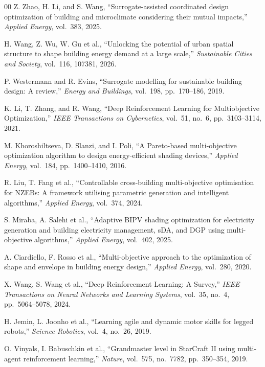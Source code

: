 \begin{thebibliography}{00}
Z. Zhao, H. Li, and S. Wang, ``Surrogate-assisted coordinated design optimization of building and microclimate considering their mutual impacts,'' \emph{Applied Energy}, vol.~383, 2025.

H. Wang, Z. Wu, W. Gu et al., ``Unlocking the potential of urban spatial structure to shape building energy demand at a large scale,'' \emph{Sustainable Cities and Society}, vol.~116, 107381, 2026.

P. Westermann and R. Evins, ``Surrogate modelling for sustainable building design: A review,'' \emph{Energy and Buildings}, vol.~198, pp.~170--186, 2019.

K. Li, T. Zhang, and R. Wang, ``Deep Reinforcement Learning for Multiobjective Optimization,'' \emph{IEEE Transactions on Cybernetics}, vol.~51, no.~6, pp.~3103--3114, 2021.

M. Khoroshiltseva, D. Slanzi, and I. Poli, ``A Pareto-based multi-objective optimization algorithm to design energy-efficient shading devices,'' \emph{Applied Energy}, vol.~184, pp.~1400--1410, 2016.

R. Liu, T. Fang et al., ``Controllable cross-building multi-objective optimisation for NZEBs: A framework utilising parametric generation and intelligent algorithms,'' \emph{Applied Energy}, vol.~374, 2024.

S. Miraba, A. Salehi et al., ``Adaptive BIPV shading optimization for electricity generation and building electricity management, sDA, and DGP using multi-objective algorithms,'' \emph{Applied Energy}, vol.~402, 2025.

A. Ciardiello, F. Rosso et al., ``Multi-objective approach to the optimization of shape and envelope in building energy design,'' \emph{Applied Energy}, vol.~280, 2020.

X. Wang, S. Wang et al., ``Deep Reinforcement Learning: A Survey,'' \emph{IEEE Transactions on Neural Networks and Learning Systems}, vol.~35, no.~4, pp.~5064--5078, 2024.

H. Jemin, L. Joonho et al., ``Learning agile and dynamic motor skills for legged robots,'' \emph{Science Robotics}, vol.~4, no.~26, 2019.

O. Vinyals, I. Babuschkin et al., ``Grandmaster level in StarCraft II using multi-agent reinforcement learning,'' \emph{Nature}, vol.~575, no.~7782, pp.~350--354, 2019.


\end{thebibliography}

